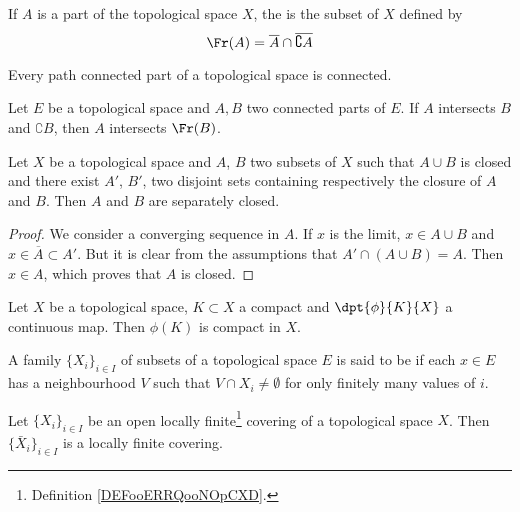 If $A$ is a part of the topological space $X$, the  is the subset of $X$ defined by
\[
	\Fr(A)=\overline{A}\cap\overline{\complement A}
\]

\begin{lemma}
	Every path connected part of a topological space is connected.
\end{lemma}

\begin{theorem}
	Let $E$ be a topological space and $A,B$ two connected parts of $E$. If $A$ intersects $B$ and $\complement B$, then $A$ intersects $\Fr(B)$.\label{tho:doine}
\end{theorem}


\begin{proposition}
	Let $X$ be a topological space and $A$, $B$ two subsets of $X$ such that $A\cup B$ is closed and there exist $A'$, $B'$, two disjoint sets containing respectively the closure of $A$ and $B$. Then $A$ and $B$ are separately closed.\label{prop:sep_ferme}
\end{proposition}

\begin{proof}
	We consider a converging sequence in $A$. If $x$ is the limit, $x\in A\cup B$ and $x\in\overline{A}\subset A'$. But it is clear from the assumptions that $A'\cap(A\cup B)=A$. Then $x\in A$, which proves that $A$ is closed.
\end{proof}

\begin{proposition}
	Let $X$ be a topological space, $K\subset X$ a compact and $\dpt{\phi}{K}{X}$ a continuous map. Then $\phi(K)$ is compact in $X$.
\end{proposition}

\begin{definition}		\label{DEFooERRQooNOpCXD}
	A family $\{ X_i \}_{i\in I}$ of subsets of a topological space $E$ is said to be  if each $x\in E$ has a neighbourhood $V$ such that $V\cap X_i \neq \emptyset$ for only finitely many values of $i$.
\end{definition}

\begin{lemma}		\label{LEMooGRPUooVhmqDH}
	Let \( \{ X_i \}_{i\in I}\) be an open locally finite\footnote{Definition \ref{DEFooERRQooNOpCXD}.} covering of a topological space \( X\). Then \( \{ \bar X_i \}_{i\in I}\) is a locally finite covering.
\end{lemma}

